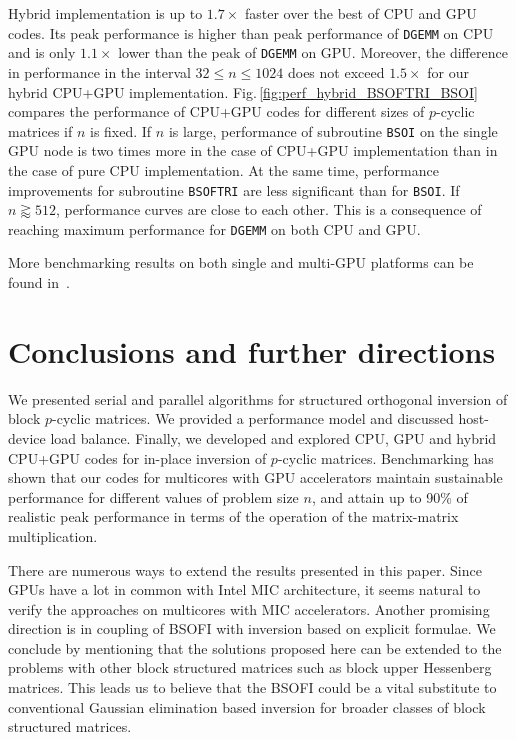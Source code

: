 \documentclass{llncs}
\newcommand{\Bsoftri}{\texttt{BSOFTRI}\xspace}
\newcommand{\Bsoi}{\texttt{BSOI}\xspace}
\newcommand{\Gemm}{\texttt{DGEMM}\xspace}
\begin{document}
%
Hybrid implementation is up to $1.7\times$ faster over the 
best of CPU and GPU codes.
Its peak performance is higher than peak 
performance of \Gemm on CPU 
and is only $1.1\times$ lower than the peak of \Gemm on GPU.
Moreover, 
the difference in performance in the interval $32 \leq n \leq 1024$ 
does not exceed $1.5\times$ for our hybrid CPU+GPU implementation. %
Fig.\,\ref{fig:perf_hybrid_BSOFTRI_BSOI}
compares 
the performance of CPU+GPU codes for different sizes of $p$-cyclic matrices if $n$ is fixed. 
If $n$ is large, performance of subroutine \Bsoi on the single GPU node 
is two times more in the case of CPU+GPU implementation  
than in the case of pure CPU implementation.
At the same time, 
performance improvements for subroutine \Bsoftri 
are less significant than for \Bsoi.
If $n \gtrapprox 512$, performance curves are close to each other. 
This is a consequence of reaching maximum performance for \Gemm
on both CPU and GPU. 

More benchmarking results on both single and multi-GPU platforms 
can be found in~\cite{GogolenkoBai13}.

\section{Conclusions and further directions}
\label{sec:conclusions}

We presented serial and parallel algorithms for structured orthogonal inversion
of block $p$-cyclic matrices.
We provided a performance model and discussed host-device load balance.
Finally, we developed and explored CPU, GPU and hybrid CPU+GPU codes
for in-place inversion of $p$-cyclic matrices.
Benchmarking has shown that 
our codes for multicores with GPU accelerators
maintain sustainable performance for different values 
of problem size $n$, and attain up to 90\% of realistic peak performance in 
terms of the operation of the matrix-matrix multiplication. 

There are numerous ways to extend the results presented in this paper.
Since GPUs have a lot in common with Intel MIC architecture, 
it seems natural to verify the approaches
on multicores with MIC accelerators.
Another promising direction is in coupling of 
BSOFI with inversion based on explicit formulae. 
We conclude by mentioning 
that the solutions proposed here can be extended to 
the problems with other block structured matrices such as
block upper Hessenberg matrices. 
This leads us to believe that the BSOFI could be a vital substitute 
to conventional Gaussian elimination based inversion
for broader classes of block structured matrices.



\end{document}
